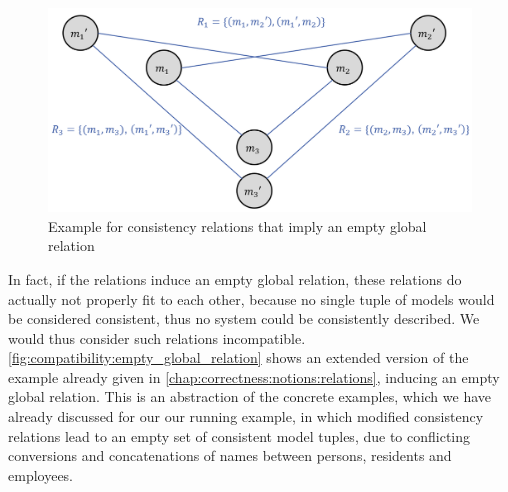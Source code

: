 \begin{figure}
    \centering
    \includegraphics[width=\textwidth]{figures/correctness/compatibility/empty_global_relation.png}
    \caption[Consistency relations that imply an empty global relation]{Example for consistency relations that imply an empty global relation}
    \label{fig:compatibility:empty_global_relation}
\end{figure}

In fact, if the relations induce an empty global relation, these relations do actually not properly fit to each other, because no single tuple of models would be considered consistent, thus no system could be consistently described.
We would thus consider such relations incompatible.
\autoref{fig:compatibility:empty_global_relation} shows an extended version of the example already given in \autoref{chap:correctness:notions:relations}, inducing an empty global relation.
This is an abstraction of the concrete examples, which we have already discussed for our our running example, in which modified consistency relations lead to an empty set of consistent model tuples, due to conflicting conversions and concatenations of names between persons, residents and employees.

